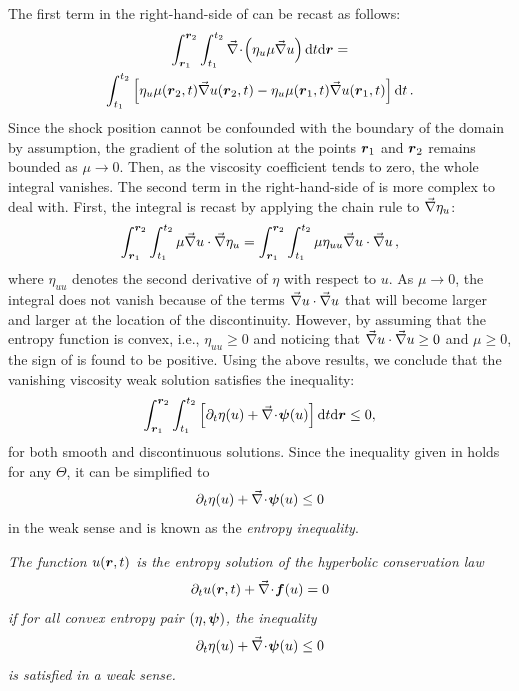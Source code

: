 %
The first term in the right-hand-side of  can be recast as follows:
%
\begin{multline}\label{eq:weak_sol11_sct1b}
\int_{\boldsymbol r_1}^{\boldsymbol r_2} \int_{t_1}^{t_2}  \vec{\nabla}\! \cdot \! \left( \eta_u \mu \vec{\nabla} u \right) \text{d}t \text{d} \boldsymbol r = \\
\int_{t_1}^{t_2} \left[ \eta_u \mu(\boldsymbol r_2,t ) \vec{\nabla} u( \boldsymbol r_2,t) - \eta_u \mu(\boldsymbol r_1,t ) \vec{\nabla} u( \boldsymbol r_1,t) \right] \text{d}t \,.
\end{multline}
%
Since the shock position cannot be confounded with the boundary of the domain by assumption, the gradient of the solution at the points $\boldsymbol r_1$ and $\boldsymbol r_2$ remains bounded as $\mu \to 0$. Then, as the viscosity coefficient tends to zero, the whole integral vanishes. The second term in the right-hand-side of  is more complex to deal with. First, the integral is recast by applying the chain rule to $\vec{\nabla} \eta_u$:
%
\begin{equation}\label{eq:weak_sol12_sct1b}
\int_{\boldsymbol r_1}^{\boldsymbol r_2} \int_{t_1}^{t_2} \mu \vec{\nabla} u \cdot \vec{\nabla} \eta_u = \int_{\boldsymbol r_1}^{\boldsymbol r_2} \int_{t_1}^{t_2} \mu\eta_{uu} \vec{\nabla} u \cdot \vec{\nabla} u \,,
\end{equation}
%
where $\eta_{uu}$ denotes the second derivative of $\eta$ with respect to $u$. As $\mu \to 0$, the integral does not vanish because of the terms $\vec{\nabla} u \cdot \vec{\nabla} u$ that will become larger and larger at the location of the discontinuity. However, by assuming that the entropy function is convex, i.e., $\eta_{uu} \geq 0$ and noticing that $\vec{\nabla} u \cdot \vec{\nabla} u \geq 0$ and $\mu \geq 0$, the sign of  is found to be positive. Using the above results, we conclude that the vanishing viscosity weak solution satisfies the inequality:
%
\begin{equation}\label{eq:weak_sol13_sct1b}
\int_{\boldsymbol r_1}^{\boldsymbol r_2} \int_{t_1}^{t_2} \left[ \partial_t \eta (u) + \vec{\nabla}\! \cdot \! \boldsymbol\psi (u) \right] \text{d}t \text{d} \boldsymbol r  \leq 0,
\end{equation}
% 
for both smooth and discontinuous solutions.  Since the inequality given in  holds for any $\Theta$, it can be simplified to
%
\begin{equation}\label{eq:weak_sol14_sct1b}
\partial_t \eta (u) + \vec{\nabla}\! \cdot \! \boldsymbol\psi (u) \leq 0
\end{equation}
%
in the weak sense and is known as the \emph{entropy inequality}. 
%
\begin{definition}
\emph{The function $u(\boldsymbol r, t)$ is the entropy solution of the hyperbolic conservation law 
%
\begin{equation}
\partial_t u( \boldsymbol r, t) + \vec{\nabla}\! \cdot \! \boldsymbol f(u) = 0 \nonumber
\end{equation}
%
if for all convex entropy pair $\left( \eta,\boldsymbol\psi \right)$, the inequality 
%
\begin{equation}
\partial_t \eta (u) + \vec{\nabla}\! \cdot \! \boldsymbol\psi (u) \leq 0 \nonumber
\end{equation}
%
is satisfied in a weak sense.}
\end{definition}

